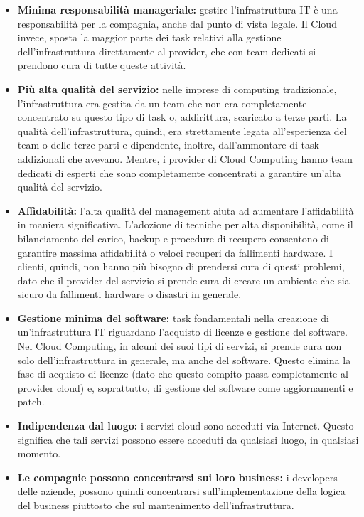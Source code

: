 \documentclass{article}
\begin{document}
\begin{itemize}
    \item \textbf{Minima responsabilità manageriale:} gestire l’infrastruttura IT è una responsabilità per la compagnia, anche dal punto di vista legale. Il Cloud invece, sposta la maggior parte dei task relativi alla gestione dell’infrastruttura direttamente al provider, che con team dedicati si prendono cura di tutte queste attività.
    \item \textbf{Più alta qualità del servizio:} nelle imprese di computing tradizionale, l’infrastruttura era gestita da un team che non era completamente concentrato su questo tipo di task o, addirittura, scaricato a terze parti. La qualità dell’infrastruttura, quindi, era strettamente legata all’esperienza del team o delle terze parti e dipendente, inoltre, dall’ammontare di task addizionali che avevano. Mentre, i provider di Cloud Computing hanno team dedicati di esperti che sono completamente concentrati a garantire un’alta qualità del servizio.
    \item \textbf{Affidabilità:} l’alta qualità del management aiuta ad aumentare l’affidabilità in maniera significativa. L’adozione di tecniche per alta disponibilità, come il bilanciamento del carico, backup e procedure di recupero consentono di garantire massima affidabilità o veloci recuperi da fallimenti hardware. I clienti, quindi, non hanno più bisogno di prendersi cura di questi problemi, dato che il provider del servizio si prende cura di creare un ambiente che sia sicuro da fallimenti hardware o disastri in generale.
    \item \textbf{Gestione minima del software:} task fondamentali nella creazione di un’infrastruttura IT riguardano l’acquisto di licenze e gestione del software. Nel Cloud Computing, in alcuni dei suoi tipi di servizi, si prende cura non solo dell’infrastruttura in generale, ma anche del software. Questo elimina la fase di acquisto di licenze (dato che questo compito passa completamente al provider cloud) e, soprattutto, di gestione del software come aggiornamenti e patch.
    \item \textbf{Indipendenza dal luogo:} i servizi cloud sono acceduti via Internet. Questo significa che tali servizi possono essere acceduti da qualsiasi luogo, in qualsiasi momento.
    \item \textbf{Le compagnie possono concentrarsi sui loro business:} i developers delle aziende, possono quindi concentrarsi sull’implementazione della logica del business piuttosto che sul mantenimento dell’infrastruttura.
\end{itemize}
\end{document}
